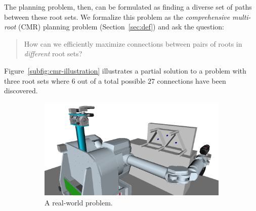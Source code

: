 The planning problem, then,
can be formulated as finding a diverse set of paths between these
root sets.
We formalize this problem as the \emph{comprehensive multi-root} (CMR)
planning problem (Section~\ref{sec:def}) and ask the question: 
\begin{quote}
How can we efficiently maximize connections between pairs of roots
in \emph{different} root sets?
\end{quote}
Figure~\ref{subfig:cmr-illustration} illustrates a partial solution
to a problem with three root sets where $6$
out of a total possible $27$ connections have been discovered.

\begin{figure}[t]
\centering
\begin{subfigure}[b]{0.6\linewidth}
\centering
\includegraphics[width=\linewidth]{figs/herb-drilling.png}
\caption{A real-world problem.}
\label{subfig:herb-picture}
\end{subfigure}
\begin{subfigure}[b]{0.35\linewidth}
\centering
{}
\end{subfigure}
\end{figure}
